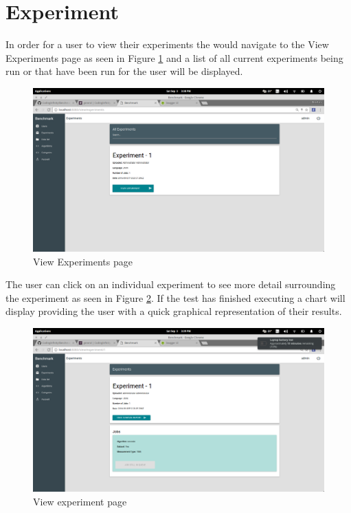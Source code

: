 \documentclass[11pt,a4paper]{article}
\begin{document}
\clearpage
\section{Experiment}
In order for a user to view their experiments the would navigate to the View Experiments
page as seen in Figure \ref{fig:viewExperiments} and a list of all current experiments 
being run or that have been run for the user will be displayed. 
\begin{figure}[H]
	\begin{center}
		\includegraphics[scale=0.3]{../Images/User Manual/View Experiments.png}
		\caption{View Experiments page}
		\label{fig:viewExperiments}
	\end{center}  
\end{figure}
\clearpage
 The user can click on an individual experiment to see more detail surrounding the experiment
 as seen in Figure \ref{fig:viewExperiment}. If the test has finished executing a chart will
 display providing the user with a quick graphical representation of their results.
\begin{figure}[H]
	\begin{center}
		\includegraphics[scale=0.3]{../Images/User Manual/View Experiment.png}
		\caption{View experiment page}
		\label{fig:viewExperiment}
	\end{center}  
\end{figure}
\end{document}
